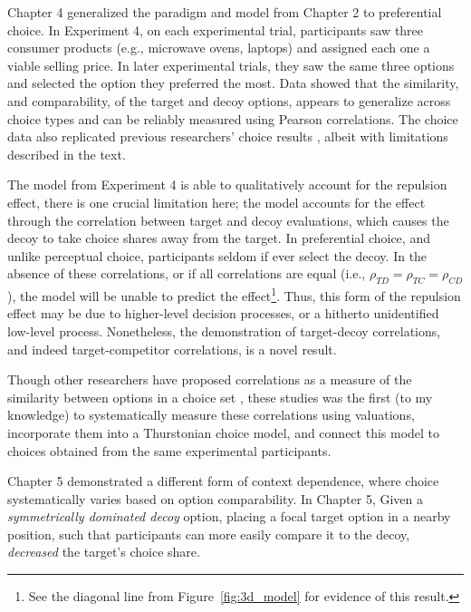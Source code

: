 Chapter 4 generalized the paradigm and model from Chapter 2 to preferential choice. In Experiment 4, on each experimental trial, participants saw three consumer products (e.g., microwave ovens, laptops) and assigned each one a viable selling price. In later experimental trials, they saw the same three options and selected the option they preferred the most. Data showed that the similarity, and comparability, of the target and decoy options, appears to generalize across choice types and can be reliably measured using Pearson correlations. The choice data also replicated previous researchers' choice results \parencite{banerjeeFactorsThatPromote2024}, albeit with limitations described in the text.

The model from Experiment 4 is able to qualitatively account for the repulsion effect, there is one crucial limitation here; the model accounts for the effect through the correlation between target and decoy evaluations, which causes the decoy to take choice shares away from the target. In preferential choice, and unlike perceptual choice, participants seldom if ever select the decoy. In the absence of these correlations, or if all correlations are equal (i.e., $\rho_{TD}=\rho_{TC}=\rho_{CD}$), the model will be unable to predict the effect\footnote{See the diagonal line from Figure~\ref{fig:3d_model} for evidence of this result.}. Thus, this form of the repulsion effect may be due to higher-level decision processes, or a hitherto unidentified low-level process. Nonetheless, the demonstration of target-decoy correlations, and indeed target-competitor correlations, is a novel result. 

Though other researchers have proposed correlations as a measure of the similarity between options in a choice set \parencite{kamakura1984predicting,natenzon2019random}, these studies was the first (to my knowledge) to systematically measure these correlations using valuations, incorporate them into a Thurstonian choice model, and connect this model to choices obtained from the same experimental participants.

Chapter 5 demonstrated a different form of context dependence, where choice systematically varies based on option comparability. In Chapter 5, Given a \textit{symmetrically dominated decoy} option, placing a focal target option in a nearby position, such that participants can more easily compare it to the decoy, \textit{decreased} the target's choice share. 

